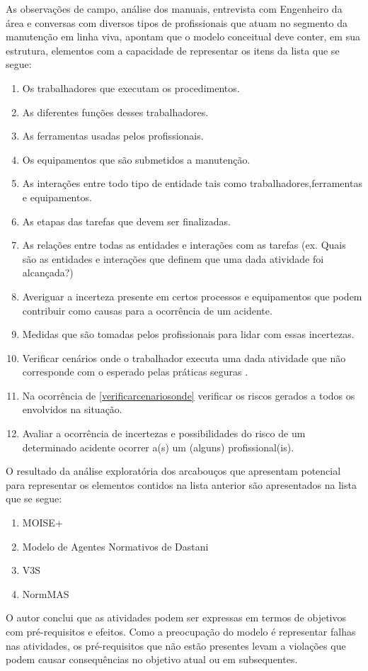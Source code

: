 As observações de campo, análise dos manuais, entrevista com Engenheiro da área e conversas com diversos tipos de profissionais que atuam no segmento da manutenção em linha viva, apontam que o modelo conceitual deve conter, em sua estrutura, elementos com a capacidade de representar os itens da lista que se segue:

\begin{enumerate}
	\item Os trabalhadores que executam os procedimentos.
	\item As diferentes funções desses trabalhadores.
	\item As ferramentas usadas pelos profissionais.
	\item Os equipamentos que são submetidos a manutenção.
	\item As interações entre todo tipo de entidade tais como trabalhadores,ferramentas e equipamentos.
	\item As etapas das tarefas que devem ser finalizadas. 
	\item As relações entre todas as entidades e interações com as tarefas (ex. Quais são as entidades e interações que definem que uma dada atividade foi alcançada?)
	\item Averiguar a incerteza presente em certos processos e equipamentos que podem contribuir como causas para a ocorrência de um acidente.
	\item Medidas que são tomadas pelos profissionais para lidar com essas incertezas.
	\item Verificar cenários onde o trabalhador executa uma dada atividade que não corresponde com o esperado pelas práticas seguras \label{verificarcenariosonde}. 
	\item Na ocorrência de \ref{verificarcenariosonde} verificar os riscos gerados a todos os envolvidos na situação.
	\item Avaliar a ocorrência de incertezas e possibilidades do risco de um determinado acidente ocorrer a(s) um (alguns) profissional(is).
\end{enumerate}

O resultado da análise exploratória dos arcabouços que apresentam potencial para representar os elementos contidos na lista anterior são apresentados na lista que se segue:

\begin{enumerate}
	\item MOISE+ 
	\item Modelo de Agentes Normativos de Dastani
	\item V3S
	\item NormMAS
\end{enumerate}

O autor conclui que as atividades podem ser expressas em termos de objetivos com pré-requisitos e efeitos. Como a preocupação do modelo é representar falhas nas atividades, os pré-requisitos que não estão presentes levam a violações que podem causar consequências no objetivo atual ou em subsequentes.
